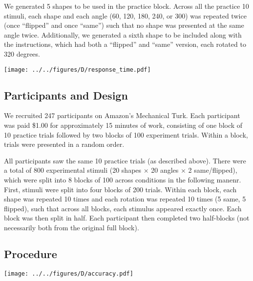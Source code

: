 \documentclass[10pt,letterpaper]{article}
\newcommand{\TODO}[1]{\textcolor{red}{[TODO: #1]}}
\begin{document}
We generated 5 shapes to be used in the practice block. Across all the
practice 10 stimuli, each shape and each angle (60, 120, 180, 240, or
300) was repeated twice (once ``flipped'' and once ``same'') such that
no shape was presented at the same angle twice. Additionally, we
generated a sixth shape to be included along with the instructions,
which had both a ``flipped'' and ``same'' version, each rotated to 320
degrees.

\begin{figure*}[t]
  \begin{center}
    \texttt{[image: ../../figures/D/response\_time.pdf]}
    \caption{\textbf{Response times.} \TODO{}}
    \label{fig:response-times}
  \end{center}
\end{figure*}


\subsection{Participants and Design}

We recruited 247 participants on Amazon's Mechanical Turk. Each
participant was paid \$1.00 for approximately 15 minutes of work,
consisting of one block of 10 practice trials followed by two blocks
of 100 experiment trials. Within a block, trials were presented in a
random order.

All participants saw the same 10 practice trials (as described
above). There were a total of 800 experimental stimuli (20 shapes
$\times$ 20 angles $\times$ 2 same/flipped), which were split into 8
blocks of 100 across conditions in the following manenr. First,
stimuli were split into four blocks of 200 trials. Within each block,
each shape was repeated 10 times and each rotation was repeated 10
times (5 same, 5 flipped), such that across all blocks, each stimulus
appeared exactly once. Each block was then split in half. Each
participant then completed two half-blocks (not necessarily both from
the original full block).

\subsection{Procedure}

\begin{figure*}[t]
  \begin{center}
    \texttt{[image: ../../figures/D/accuracy.pdf]}
    \caption{\textbf{Accuracy.} \TODO{}}
    \label{fig:accuracy}
  \end{center}
\end{figure*}
\end{document}
